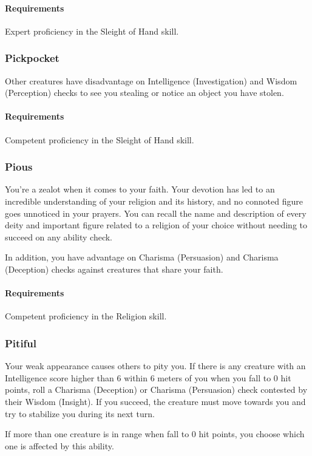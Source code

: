     \paragraph{Requirements} Expert proficiency in the Sleight of Hand skill.
\subsubsection{Pickpocket} \label{feat::pickpocket}
    Other creatures have disadvantage on Intelligence (Investigation) and Wisdom (Perception) checks to see you stealing or notice an object you have stolen.
    \paragraph{Requirements} Competent proficiency in the Sleight of Hand skill.
\subsubsection{Pious} \label{feat::pious}
    You're a zealot when it comes to your faith.
    Your devotion has led to an incredible understanding of your religion and its history, and no connoted figure goes unnoticed in your prayers.
    You can recall the name and description of every deity and important figure related to a religion of your choice without needing to succeed on any ability check.

    In addition, you have advantage on Charisma (Persuasion) and Charisma (Deception) checks against creatures that share your faith.
    \paragraph{Requirements} Competent proficiency in the Religion skill.
\subsubsection{Pitiful} \label{feat::pitiful}
    Your weak appearance causes others to pity you.
    If there is any creature with an Intelligence score higher than 6 within 6 meters of you when you fall to 0 hit points, roll a Charisma (Deception) or Charisma (Persuasion) check contested by their Wisdom (Insight).
    If you succeed, the creature must move towards you and try to stabilize you during its next turn.

    If more than one creature is in range when fall to 0 hit points, you choose which one is affected by this ability.


